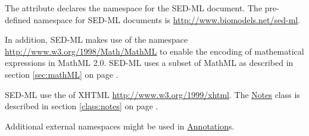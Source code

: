 \label{sec:xmlns}
The  attribute declares the namespace for the SED-ML document. The pre-defined namespace for SED-ML documents is \url{http://www.biomodels.net/sed-ml}. 

In addition, SED-ML makes use of the  namespace \url{http://www.w3.org/1998/Math/MathML} to enable the encoding of mathematical expressions in MathML 2.0. SED-ML uses a subset of MathML as described in section \ref{sec:mathML} on page \pageref{sec:mathML}.

SED-ML  use the  of XHTML \url{http://www.w3.org/1999/xhtml}.  The \hyperref[class:notes]{Notes} class is described in section \ref{class:notes} on page \pageref{class:notes}.

Additional external namespaces might be used in \hyperref[class:annotation]{Annotation}s. 


